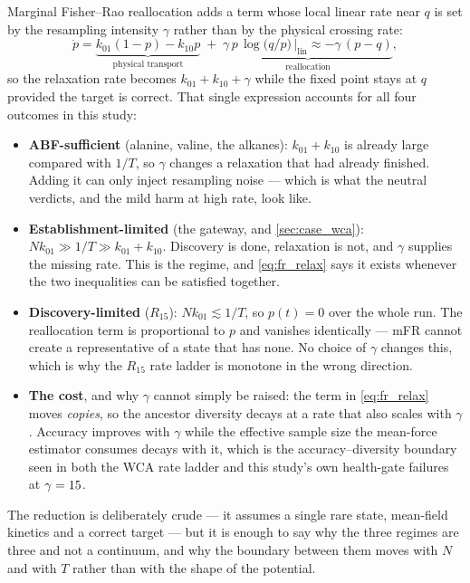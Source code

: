 Marginal Fisher--Rao reallocation adds a term whose local linear rate near $q$ is set by the
resampling intensity $\gamma$ rather than by the physical crossing rate:
\begin{equation}
  \dot p = \underbrace{k_{01}(1-p) - k_{10}p}_{\text{physical transport}}
         \;+\; \underbrace{\gamma\,p\,\log\!\big(q/p\big)\,\big|_{\text{lin}}
               \approx -\gamma\,(p-q)}_{\text{reallocation}} ,
  \label{eq:fr_relax}
\end{equation}
so the relaxation rate becomes $k_{01}+k_{10}+\gamma$ while the fixed point stays at $q$
provided the target is correct. That single expression accounts for all four outcomes in this
study:
\begin{itemize}
  \item \textbf{ABF-sufficient} (alanine, valine, the alkanes): $k_{01}+k_{10}$ is already
  large compared with $1/T$, so $\gamma$ changes a relaxation that had already finished.
  Adding it can only inject resampling noise --- which is what the neutral verdicts, and the
  mild harm at high rate, look like.
  \item \textbf{Establishment-limited} (the gateway, and \cref{sec:case_wca}):
  $N k_{01} \gg 1/T \gg k_{01}+k_{10}$. Discovery is done, relaxation is not, and $\gamma$
  supplies the missing rate. This is the regime, and \cref{eq:fr_relax} says it exists
  whenever the two inequalities can be satisfied together.
  \item \textbf{Discovery-limited} ($R_{15}$): $N k_{01} \lesssim 1/T$, so $p(t) = 0$ over the
  whole run. The reallocation term is proportional to $p$ and vanishes identically --- mFR
  cannot create a representative of a state that has none. No choice of $\gamma$ changes
  this, which is why the $R_{15}$ rate ladder is monotone in the wrong direction.
  \item \textbf{The cost}, and why $\gamma$ cannot simply be raised: the term in
  \cref{eq:fr_relax} moves \emph{copies}, so the ancestor diversity decays at a rate that
  also scales with $\gamma$. Accuracy improves with $\gamma$ while the effective sample size
  the mean-force estimator consumes decays with it, which is the accuracy--diversity boundary
  seen in both the WCA rate ladder and this study's own health-gate failures at
  $\gamma = 15$.
\end{itemize}
The reduction is deliberately crude --- it assumes a single rare state, mean-field kinetics
and a correct target --- but it is enough to say why the three regimes are three and not a
continuum, and why the boundary between them moves with $N$ and with $T$ rather than with the
shape of the potential.

